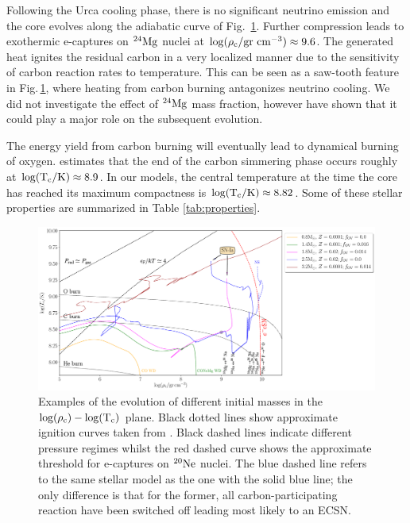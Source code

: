 \documentclass[../../main/thesis_msc.tex]{subfiles}
\begin{document}
        Following the Urca cooling phase, there is no significant neutrino emission and the core evolves along the adiabatic curve of Fig.\, \ref{fig:RhoT}. Further compression leads to exothermic e-captures on $\rm ^{24}Mg$ nuclei at $\rm \log(\rho_c/gr \ cm^{-3}) \approx 9.6$. The generated heat ignites the residual carbon in a very localized manner due to the sensitivity of carbon reaction rates to temperature. This can be seen as a saw-tooth feature in Fig.\,\ref{fig:RhoT}, where heating from carbon burning antagonizes neutrino cooling. We did not investigate the effect of $\rm ^{24}Mg$ mass fraction, however \cite{Gutierrez2005} have shown that it could play a major role on the subsequent evolution.
        
        The energy yield from carbon burning will eventually lead to dynamical burning of oxygen. \cite{Woosley2004} estimates that the end of the carbon simmering phase occurs roughly at $\rm \log(T_c/ \rm K) \approx 8.9$. In our models, the central temperature at the time the core has reached its maximum compactness is $\rm \log(T_c / \rm K) \approx 8.82$. Some of these stellar properties are summarized in Table \ref{tab:properties}.
        
        \begin{figure}[ht!]
            \centering
            \includegraphics[width=\textwidth]{../figures/chapter4/RhoT.pdf}
            \caption{Examples of the evolution of different initial masses in the $\rm \log(\rho_{\rm c})-\log(T_{\rm c})$ plane. Black dotted lines show approximate ignition curves taken from \mesa. Black dashed lines indicate different pressure regimes whilst the red dashed curve shows the approximate threshold for e-captures on $\rm ^{20}Ne$ nuclei. The blue dashed line refers to the same stellar model as the one with the solid blue line; the only difference is that for the former, all carbon-participating reaction have been switched off leading most likely to an ECSN.}
            \label{fig:RhoT}
        \end{figure}
        
\end{document}
